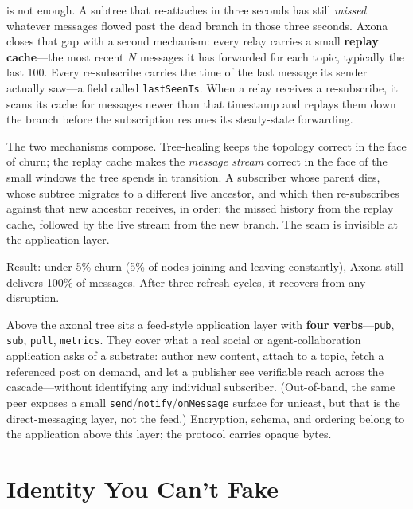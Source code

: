 \documentclass[nobib]{tufte-handout}
\begin{document}
 is not enough.  A subtree that re-attaches in three seconds has still \emph{missed} whatever messages flowed past the dead branch in those three seconds.  Axona closes that gap with a second mechanism: every relay carries a small \textbf{replay cache}---the most recent $N$ messages it has forwarded for each topic, typically the last 100. Every re-subscribe carries the time of the last message its sender actually saw---a field called \texttt{lastSeenTs}.  When a relay receives a re-subscribe, it scans its cache for messages newer than that timestamp and replays them down the branch before the subscription resumes its steady-state forwarding.

The two mechanisms compose. Tree-healing keeps the topology correct in the face of churn; the replay cache makes the \emph{message stream} correct in the face of the small windows the tree spends in transition. A subscriber whose parent dies, whose subtree migrates to a different live ancestor, and which then re-subscribes against that new ancestor receives, in order: the missed history from the replay cache, followed by the live stream from the new branch. The seam is invisible at the application layer.

Result: under 5\% churn (5\% of nodes joining and leaving constantly), Axona still delivers 100\% of messages. After three refresh cycles, it recovers from any disruption.

Above the axonal tree sits a feed-style application layer with \textbf{four verbs}---\texttt{pub}, \texttt{sub}, \texttt{pull}, \texttt{metrics}. They cover what a real social or agent-collaboration application asks of a substrate: author new content, attach to a topic, fetch a referenced post on demand, and let a publisher see verifiable reach across the cascade---without identifying any individual subscriber. (Out-of-band, the same peer exposes a small \texttt{send}/\texttt{notify}/\texttt{onMessage} surface for unicast, but that is the direct-messaging layer, not the feed.)  Encryption, schema, and ordering belong to the application above this layer; the protocol carries opaque bytes.

\section{Identity You Can't Fake}
\end{document}
